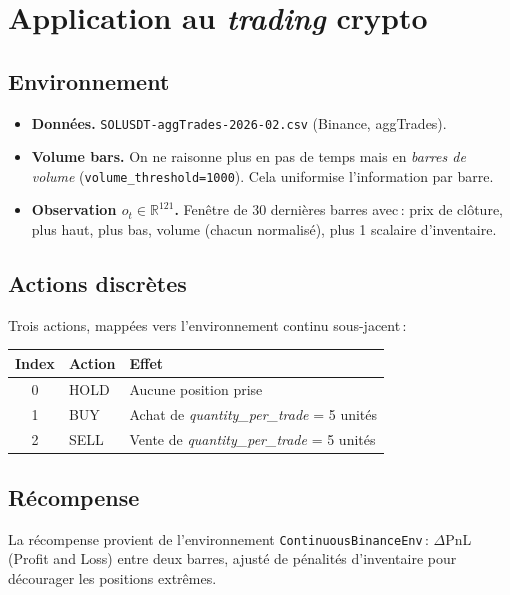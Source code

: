 \documentclass[11pt,a4paper]{article}
\begin{document}
\section{Application au \emph{trading} crypto}

\subsection{Environnement}
\begin{itemize}
    \item \textbf{Données.} \texttt{SOLUSDT-aggTrades-2026-02.csv} (Binance,
          aggTrades).
    \item \textbf{Volume bars.} On ne raisonne plus en pas de temps mais en
          \emph{barres de volume} (\texttt{volume\_threshold=1000}). Cela
          uniformise l'information par barre.
    \item \textbf{Observation \(o_t \in \mathbb{R}^{121}\).} Fenêtre de 30
          dernières barres avec\,: prix de clôture, plus haut, plus bas,
          volume (chacun normalisé), plus 1 scalaire d'inventaire.
\end{itemize}

\subsection{Actions discrètes}
Trois actions, mappées vers l'environnement continu sous-jacent\,:
\begin{center}
\begin{tabular}{cll}
\toprule
\textbf{Index} & \textbf{Action} & \textbf{Effet} \\
\midrule
0 & HOLD & Aucune position prise \\
1 & BUY  & Achat de \emph{quantity\_per\_trade} = 5 unités \\
2 & SELL & Vente de \emph{quantity\_per\_trade} = 5 unités \\
\bottomrule
\end{tabular}
\end{center}

\subsection{Récompense}
La récompense provient de l'environnement \texttt{ContinuousBinanceEnv}\,:
\(\Delta\)PnL (Profit and Loss) entre deux barres, ajusté de pénalités
d'inventaire pour décourager les positions extrêmes.
\end{document}
